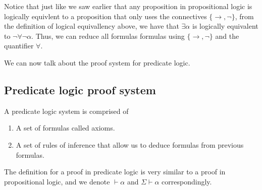 \documentclass[11pt,a4paper]{article}
\renewcommand{\implies}{\rightarrow}
\begin{document}
Notice that just like we saw earlier that any proposition in
propositional logic is logically equivlent to a proposition that
only uses the connectives $\{\implies, \neg\}$,
from the definition of logical equivallency above, we have that
$\exists \alpha$ is logically equivalent to $\neg \forall \neg \alpha$.
Thus, we can reduce all formulas formulas using $\{\implies, \neg\}$
and the quantifier $\forall$.

We can now talk about the proof system for predicate logic.

\subsection{Predicate logic proof system}
\begin{definition}
  A predicate logic system is comprised of
  \begin{enumerate}
    \item[(1)] A set of formulas called axioms.
    \item[(2)] A set of rules of inference that allow us to deduce
      formulas from previous formulas.
  \end{enumerate}
\end{definition}

The definition for a proof in predicate logic is very similar to a
proof in propositional logic, and we denote $\vdash \alpha$ and
$\Sigma \vdash \alpha$ correspondingly.
\end{document}
